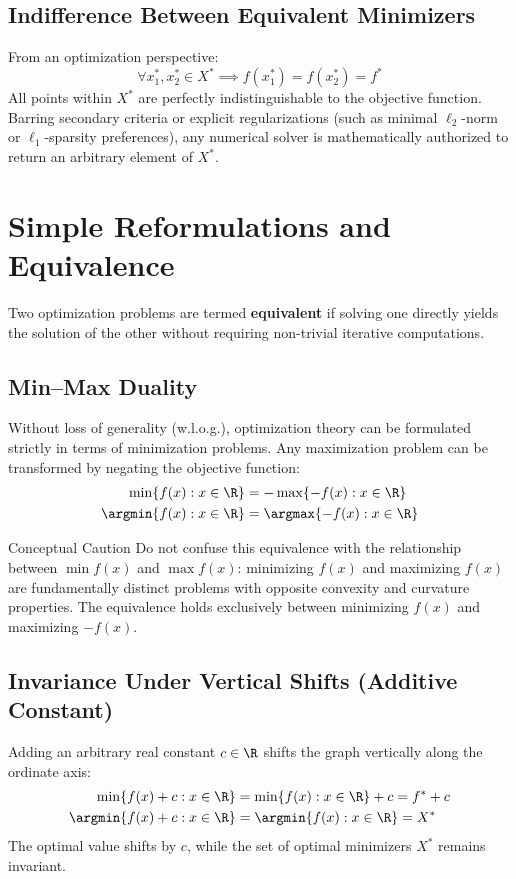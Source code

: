 \subsection{Indifference Between Equivalent Minimizers}
From an optimization perspective:
\begin{equation}
\forall x_1^*, x_2^* \in X^* \implies f(x_1^*) = f(x_2^*) = f^*
\end{equation}
All points within $X^*$ are perfectly indistinguishable to the objective function. Barring secondary criteria or explicit regularizations (such as minimal $\ell_2$-norm or $\ell_1$-sparsity preferences), any numerical solver is mathematically authorized to return an arbitrary element of $X^*$.


\FloatBarrier
\section{Simple Reformulations and Equivalence}
\label{sec:opt-reformulations-equivalence}

Two optimization problems are termed \textbf{equivalent} if solving one directly yields the solution of the other without requiring non-trivial iterative computations.

\subsection{Min--Max Duality}
Without loss of generality (w.l.o.g.), optimization theory can be formulated strictly in terms of minimization problems. Any maximization problem can be transformed by negating the objective function:
\begin{align}
\min \{ f(x) : x \in \R \} &= - \max \{ -f(x) : x \in \R \} \\
\argmin \{ f(x) : x \in \R \} &= \argmax \{ -f(x) : x \in \R \}
\end{align}

\begin{alertblock}{Conceptual Caution}
Do not confuse this equivalence with the relationship between $\min f(x)$ and $\max f(x)$: minimizing $f(x)$ and maximizing $f(x)$ are fundamentally distinct problems with opposite convexity and curvature properties. The equivalence holds exclusively between minimizing $f(x)$ and maximizing $-f(x)$.
\end{alertblock}

\subsection{Invariance Under Vertical Shifts (Additive Constant)}
Adding an arbitrary real constant $c \in \R$ shifts the graph vertically along the ordinate axis:
\begin{align}
\min \{ f(x) + c : x \in \R \} &= \min \{ f(x) : x \in \R \} + c = f^* + c \\
\argmin \{ f(x) + c : x \in \R \} &= \argmin \{ f(x) : x \in \R \} = X^*
\end{align}
The optimal value shifts by $c$, while the set of optimal minimizers $X^*$ remains invariant.

